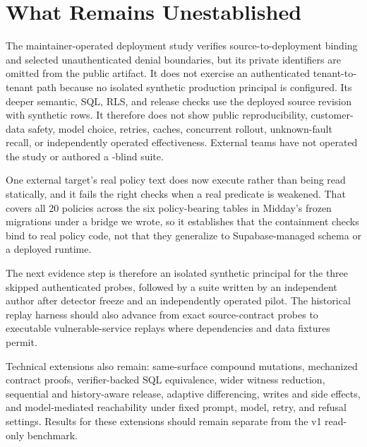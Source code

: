 \section{What Remains Unestablished}

The maintainer-operated deployment study verifies source-to-deployment binding and selected unauthenticated denial boundaries, but its private identifiers are omitted from the public artifact. It does not exercise an authenticated tenant-to-tenant path because no isolated synthetic production principal is configured. Its deeper semantic, SQL, RLS, and release checks use the deployed source revision with synthetic rows. It therefore does not show public reproducibility, customer-data safety, model choice, retries, caches, concurrent rollout, unknown-fault recall, or independently operated effectiveness. External teams have not operated the study or authored a \policystrata-blind suite.

One external target's real policy text does now execute rather than being read statically, and it fails the right checks when a real predicate is weakened. That covers all 20 policies across the six policy-bearing tables in Midday's frozen migrations under a bridge we wrote, so it establishes that the containment checks bind to real policy code, not that they generalize to Supabase-managed schema or a deployed runtime.

The next evidence step is therefore an isolated synthetic principal for the three skipped authenticated probes, followed by a suite written by an independent author after detector freeze and an independently operated pilot. The historical replay harness should also advance from exact source-contract probes to executable vulnerable-service replays where dependencies and data fixtures permit.

Technical extensions also remain: same-surface compound mutations, mechanized contract proofs, verifier-backed SQL equivalence, wider witness reduction, sequential and history-aware release, adaptive differencing, writes and side effects, and model-mediated reachability under fixed prompt, model, retry, and refusal settings. Results for these extensions should remain separate from the v1 read-only benchmark.
